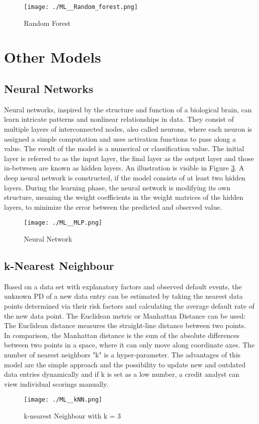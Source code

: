 \begin{figure}[H]
	\centering
	\texttt{[image: ./ML\_\_Random\_forest.png]}
    \caption{Random Forest}
    \label{fig:ml_ranforest}
\end{figure}

\section{Other Models}

\subsection{Neural Networks}
Neural networks, inspired by the structure and function of a biological brain, can learn intricate patterns and nonlinear relationships in data. They consist of multiple layers of interconnected nodes, also called neurons, where each neuron is assigned a simple computation and uses activation functions to pass along a value. The result of the model is a numerical or classification value. The initial layer is referred to as the input layer, the final layer as the output layer and those in-between are known as hidden layers. An illustration is visible in Figure \ref{fig:ml_neurnet}. A deep neural network is constructed, if the model consists of at least two hidden layers. During the learning phase, the neural network is modifying its own structure, meaning the weight coefficients in the weight matrices of the hidden layers, to minimize the error between the predicted and observed value. \cite[pp.~24-25]{locatelli:2022}

\begin{figure}[H]
	\centering
	\texttt{[image: ./ML\_\_MLP.png]}
    \caption{Neural Network}
    \label{fig:ml_neurnet}
\end{figure}

\subsection{k-Nearest Neighbour}
\label{sec:kNN}
Based on a data set with explanatory factors and observed default events, the unknown PD of a new data entry can be estimated by taking the nearest data points determined via their risk factors and calculating the average default rate of the new data point. The Euclidean metric or Manhattan Distance can be used: The Euclidean distance measures the straight-line distance between two points. In comparison, the Manhattan distance is the sum of the absolute differences between two points in a space, where it can only move along coordinate axes. The number of nearest neighbors "k" is a hyper-parameter. The advantages of this model are the simple approach and the possibility to update new and outdated data entries dynamically and if k is set as a low number, a credit analyst can view individual scorings manually. \cite[p.~83]{Witzany:2017}

\begin{figure}[H]
	\centering
	\texttt{[image: ./ML\_\_kNN.png]}
    \caption{k-nearest Neighbour with k = 3}
    \label{fig:ml_neurnet}
\end{figure}